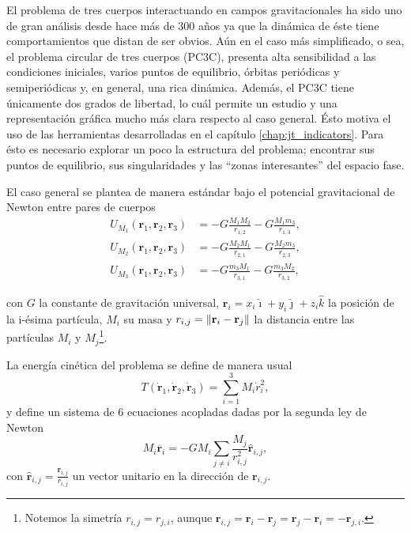 El problema de tres cuerpos interactuando en campos gravitacionales ha sido uno de gran análisis desde hace más de 300 años ya que la dinámica de éste tiene comportamientos que distan de ser obvios. Aún en el caso más simplificado, o sea, el problema circular de tres cuerpos (PC3C), presenta alta sensibilidad a las condiciones iniciales, varios puntos de equilibrio, órbitas periódicas y semiperiódicas y, en general, una rica dinámica. Además, el PC3C tiene únicamente dos grados de libertad, lo cuál permite un estudio y una representación gráfica mucho más clara respecto al caso general. Ésto motiva el uso de las herramientas desarrolladas en el capítulo \ref{chap:jt_indicators}. Para ésto es necesario explorar un poco la estructura del problema; encontrar sus puntos de equilibrio, sus singularidades y las ``zonas interesantes'' del espacio fase.

El caso general se plantea de manera estándar bajo el potencial gravitacional de Newton entre pares de cuerpos 
\begin{align}
 U_{M_1}(\mathbf{r}_1,\mathbf{r}_2,\mathbf{r}_3) &= -G \frac{M_1 M_2}{r_{1,2}} - G \frac{M_1 m_3}{r_{1,3}}, \\
 U_{M_2}(\mathbf{r}_1,\mathbf{r}_2,\mathbf{r}_3) &= -G \frac{M_2 M_1}{r_{2,1}} - G \frac{M_2 m_3}{r_{2,3}}, \\
 U_{M_3}(\mathbf{r}_1,\mathbf{r}_2,\mathbf{r}_3) &= -G \frac{m_3 M_1}{r_{3,1}} - G \frac{m_3 M_2}{r_{3,2}},
 \label{eq:3body_potential}
\end{align}

con $G$ la constante de gravitación universal, $\mathbf{r}_i = x_i \hat{\imath} + y_i \hat{\jmath} + z_i \hat{k}$ la posición de la i-ésima partícula, $M_i$ su masa y $r_{i,j} = \left\lVert \mathbf{r}_i - \mathbf{r}_j\right\rVert$ la distancia entre las partículas $M_i$ y $M_j$\footnote{Notemos la simetría $r_{i,j} = r_{j,i}$, aunque $\mathbf{r}_{i,j} = \mathbf{r}_i - \mathbf{r}_j = \mathbf{r}_j - \mathbf{r}_i  = - \mathbf{r}_{j,i}$.}. 

La energía cinética del problema se define de manera usual 
\begin{equation}
 T(\dot{\mathbf{r}}_1,\dot{\mathbf{r}}_2,\dot{\mathbf{r}}_3) = \sum_{i=1}^3 M_i \dot{r}_i^2,
 \label{eq:3body_kinetic}
\end{equation}
y define un sistema de 6 ecuaciones acopladas dadas por la segunda ley de Newton
\begin{equation}
 M_i \ddot{\mathbf{r}_i} = - G M_i \sum_{j\neq i} \frac{M_j}{r_{i,j}^2} \hat{\mathbf{r}}_{i,j},
 \label{eq:3body_eqs_motion}
\end{equation}
con $\hat{\mathbf{r}}_{i,j} = \frac{\mathbf{r}_{i,j}}{r_{i,j}}$ un vector unitario en la dirección de $\mathbf{r}_{i,j}$.

